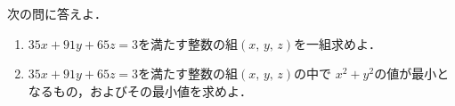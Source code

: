 \documentclass[../../main.tex]{subfiles}
\begin{document}
次の問に答えよ．
\begin{enumerate}
  \item$35x+91y+65z=3$を満たす整数の組$(x, \, y, \, z)$を一組求めよ．
  \item$35x+91y+65z=3$を満たす整数の組$(x, \, y, \, z)$の中で
    $x^2+y^2$の値が最小となるもの，およびその最小値を求めよ．
\end{enumerate}
\end{document}
